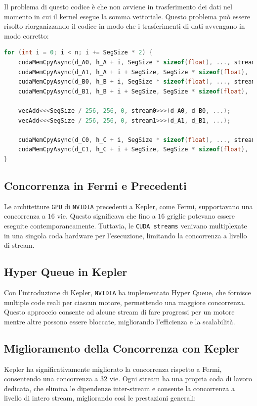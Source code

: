 Il problema di questo codice è che non avviene in trasferimento dei dati
nel momento in cui il kernel esegue la somma vettoriale. Questo problema
può essere risolto riorganizzando il codice in modo che i trasferimenti
di dati avvengano in modo corretto:
\begin{lstlisting}[language=C]
for (int i = 0; i < n; i += SegSize * 2) {
    cudaMemCpyAsync(d_A0, h_A + i, SegSize * sizeof(float), ..., stream0);
    cudaMemCpyAsync(d_A1, h_A + i + SegSize, SegSize * sizeof(float), ..., stream1);
    cudaMemCpyAsync(d_B0, h_B + i, SegSize * sizeof(float), ..., stream0);
    cudaMemCpyAsync(d_B1, h_B + i + SegSize, SegSize * sizeof(float), ..., stream1);

    vecAdd<<<SegSize / 256, 256, 0, stream0>>>(d_A0, d_B0, ...);
    vecAdd<<<SegSize / 256, 256, 0, stream1>>>(d_A1, d_B1, ...);

    cudaMemCpyAsync(d_C0, h_C + i, SegSize * sizeof(float), ..., stream0);
    cudaMemCpyAsync(d_C1, h_C + i + SegSize, SegSize * sizeof(float), ..., stream1);
}
\end{lstlisting}

\subsection{Concorrenza in Fermi e Precedenti}
Le architetture \texttt{GPU} di \texttt{NVIDIA} precedenti a Kepler, come Fermi,
supportavano una concorrenza a $16$ vie. Questo significava che fino a
$16$ griglie potevano essere eseguite contemporaneamente. Tuttavia, le
\texttt{CUDA streams} venivano multiplexate in una singola coda hardware
per l'esecuzione, limitando la concorrenza a livello di stream.

\subsection{Hyper Queue in Kepler}
Con l'introduzione di Kepler, \texttt{NVIDIA} ha implementato Hyper Queue,
che fornisce multiple code reali per ciascun motore, permettendo una maggiore
concorrenza. Questo approccio consente ad alcune stream di fare progressi
per un motore mentre altre possono essere bloccate, migliorando l'efficienza
e la scalabilità.

\subsection{Miglioramento della Concorrenza con Kepler}
Kepler ha significativamente migliorato la concorrenza rispetto a Fermi,
consentendo una concorrenza a $32$ vie. Ogni stream ha una propria coda
di lavoro dedicata, che elimina le dipendenze inter-stream e consente
la concorrenza a livello di intero stream, migliorando così le
prestazioni generali:


